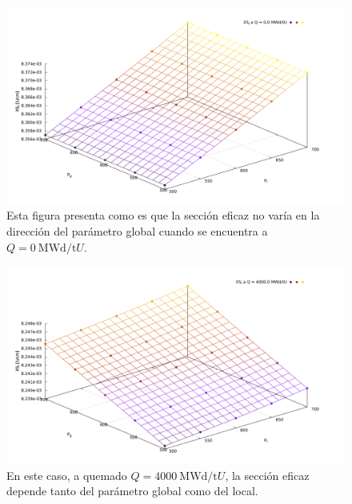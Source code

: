 \documentclass[11pt]{article}
\begin{document}
\begin{figure}[!h]
 \begin{center}
  \includegraphics[width=0.78\linewidth]{graficos/dependencias-xs/XS1.pdf}
 \end{center}
\caption{\label{fig:global-local-pth-1} Esta figura presenta como es que la sección eficaz no varía en la dirección del parámetro global cuando se encuentra a $Q = \SI{0}{\mega\watt\day\per\tonne U}$.}
\end{figure}

\begin{figure}[!h]
 \begin{center}
  \includegraphics[width=0.78\linewidth]{graficos/dependencias-xs/XS2.pdf}
 \end{center}
\caption{\label{fig:global-local-pth-2} En este caso, a quemado $Q = \SI{4000}{\mega\watt\day\per\tonne U}$, la sección eficaz depende tanto del parámetro global como del local.}
\end{figure}
\end{document}
